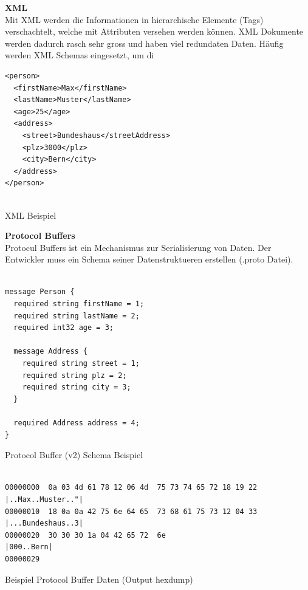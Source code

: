 \textbf{XML} \\
Mit XML werden die Informationen in hierarchische Elemente (Tags) verschachtelt, welche mit Attributen versehen werden können. XML Dokumente werden dadurch rasch sehr gross und haben viel redundaten Daten. Häufig werden XML Schemas eingesetzt, um di

\begin{listing}[H]
\begin{verbatim}
<person>
  <firstName>Max</firstName>
  <lastName>Muster</lastName>
  <age>25</age>
  <address>
    <street>Bundeshaus</streetAddress>
    <plz>3000</plz>
    <city>Bern</city>
  </address>
</person>


\end{verbatim}
\caption{XML Beispiel}
\end{listing}



\textbf{Protocol Buffers} \\
Protocul Buffers ist ein Mechanismus zur Serialisierung von Daten. Der Entwickler muss ein Schema seiner Datenstruktueren erstellen (.proto Datei).

\begin{listing}[H]
\begin{verbatim}

message Person {
  required string firstName = 1;
  required string lastName = 2;
  required int32 age = 3;

  message Address {
    required string street = 1;
    required string plz = 2;
    required string city = 3;
  }
  
  required Address address = 4;
}

\end{verbatim}
\caption{Protocol Buffer (v2) Schema Beispiel}
\end{listing}


\begin{listing}[H]
\begin{verbatim}
               
00000000  0a 03 4d 61 78 12 06 4d  75 73 74 65 72 18 19 22  |..Max..Muster.."|
00000010  18 0a 0a 42 75 6e 64 65  73 68 61 75 73 12 04 33  |...Bundeshaus..3|
00000020  30 30 30 1a 04 42 65 72  6e                       |000..Bern|
00000029

\end{verbatim}
\caption{Beispiel Protocol Buffer Daten (Output hexdump)}
\end{listing}


